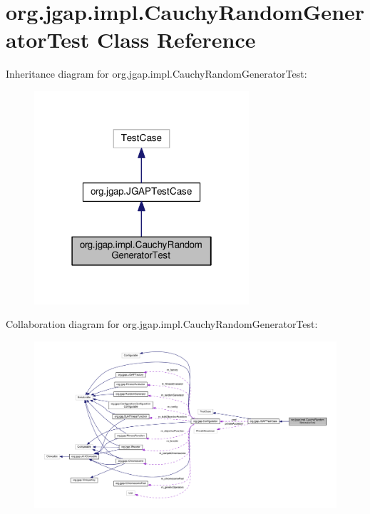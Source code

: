\hypertarget{classorg_1_1jgap_1_1impl_1_1_cauchy_random_generator_test}{\section{org.\-jgap.\-impl.\-Cauchy\-Random\-Generator\-Test Class Reference}
\label{classorg_1_1jgap_1_1impl_1_1_cauchy_random_generator_test}
}


Inheritance diagram for org.\-jgap.\-impl.\-Cauchy\-Random\-Generator\-Test\-:
\nopagebreak
\begin{figure}[H]
\begin{center}
\leavevmode
\includegraphics[width=226pt]{classorg_1_1jgap_1_1impl_1_1_cauchy_random_generator_test__inherit__graph}
\end{center}
\end{figure}


Collaboration diagram for org.\-jgap.\-impl.\-Cauchy\-Random\-Generator\-Test\-:
\nopagebreak
\begin{figure}[H]
\begin{center}
\leavevmode
\includegraphics[width=350pt]{classorg_1_1jgap_1_1impl_1_1_cauchy_random_generator_test__coll__graph}
\end{center}
\end{figure}

